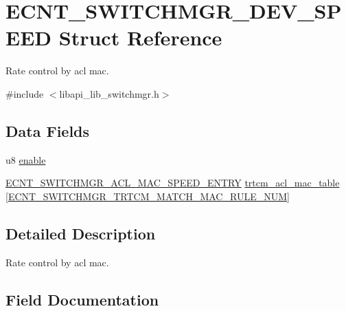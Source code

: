 \hypertarget{structECNT__SWITCHMGR__DEV__SPEED}{}\section{E\+C\+N\+T\+\_\+\+S\+W\+I\+T\+C\+H\+M\+G\+R\+\_\+\+D\+E\+V\+\_\+\+S\+P\+E\+ED Struct Reference}
\label{structECNT__SWITCHMGR__DEV__SPEED}


Rate control by acl mac.  




{\ttfamily \#include $<$libapi\+\_\+lib\+\_\+switchmgr.\+h$>$}

\subsection*{Data Fields}
\begin{DoxyCompactItemize}
\item 
u8 \hyperlink{structECNT__SWITCHMGR__DEV__SPEED_adc882225808b882c5d5037f04942d89a}{enable}
\item 
\hyperlink{structECNT__SWITCHMGR__ACL__MAC__SPEED__ENTRY}{E\+C\+N\+T\+\_\+\+S\+W\+I\+T\+C\+H\+M\+G\+R\+\_\+\+A\+C\+L\+\_\+\+M\+A\+C\+\_\+\+S\+P\+E\+E\+D\+\_\+\+E\+N\+T\+RY} \hyperlink{structECNT__SWITCHMGR__DEV__SPEED_ac38251d75b5f97aa694db2f4e18f3227}{trtcm\+\_\+acl\+\_\+mac\+\_\+table} \mbox{[}\hyperlink{libapi__lib__switchmgr_8h_a3930ec373da9905ced88fe17677c6011}{E\+C\+N\+T\+\_\+\+S\+W\+I\+T\+C\+H\+M\+G\+R\+\_\+\+T\+R\+T\+C\+M\+\_\+\+M\+A\+T\+C\+H\+\_\+\+M\+A\+C\+\_\+\+R\+U\+L\+E\+\_\+\+N\+UM}\mbox{]}
\end{DoxyCompactItemize}


\subsection{Detailed Description}
Rate control by acl mac. 

\subsection{Field Documentation}
\mbox{\label{structECNT__SWITCHMGR__DEV__SPEED_adc882225808b882c5d5037f04942d89a}} 
